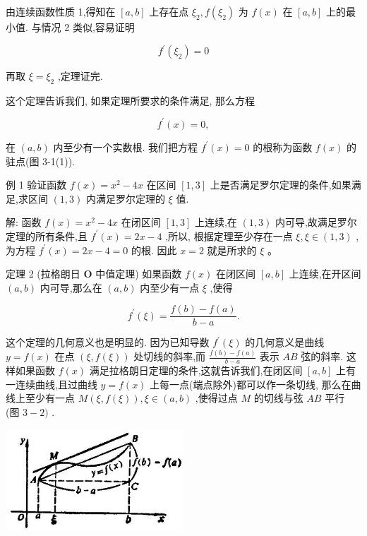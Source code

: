 \documentclass[10pt]{article}
\begin{document}
由连续函数性质 1,得知在 \(\left\lbrack {a,b}\right\rbrack\) 上存在点 \({\xi }_{2},f\left( {\xi }_{2}\right)\) 为 \(f\left( x\right)\) 在 \(\left\lbrack {a,b}\right\rbrack\) 上的最小值. 与情况 2 类似,容易证明

\[
{f}^{\prime }\left( {\xi }_{2}\right) = 0
\]

再取 \(\xi = {\xi }_{2}\) ,定理证完.

这个定理告诉我们, 如果定理所要求的条件满足, 那么方程

\[
{f}^{\prime }\left( x\right) = 0,
\]

在 \(\left( {a,b}\right)\) 内至少有一个实数根. 我们把方程 \({f}^{\prime }\left( x\right) = 0\) 的根称为函数 \(f\left( x\right)\) 的驻点(图 3-1(1)).

例 1 验证函数 \(f\left( x\right) = {x}^{2} - {4x}\) 在区间 \(\left\lbrack {1,3}\right\rbrack\) 上是否满足罗尔定理的条件,如果满足,求区间 \(\left( {1,3}\right)\) 内满足罗尔定理的 \(\xi\) 值.

解: 函数 \(f\left( x\right) = {x}^{2} - {4x}\) 在闭区间 \(\left\lbrack {1,3}\right\rbrack\) 上连续,在 \(\left( {1,3}\right)\) 内可导,故满足罗尔定理的所有条件,且 \({f}^{\prime }\left( x\right) = {2x} - 4\) ,所以, 根据定理至少存在一点 \(\xi ,\xi \in \left( {1,3}\right)\) ,为方程 \({f}^{\prime }\left( x\right) = {2x} - 4 = 0\) 的根. 因此 \(x = 2\) 就是所求的 \(\xi\) 。

定理 2 (拉格朗日 \(\mathbf{O}\) 中值定理) 如果函数 \(f\left( x\right)\) 在闭区间 \(\left\lbrack {a,b}\right\rbrack\) 上连续,在开区间 \(\left( {a,b}\right)\) 内可导,那么在 \(\left( {a,b}\right)\) 内至少有一点 \(\xi\) ,使得

\[
{f}^{\prime }\left( \xi \right) = \frac{f\left( b\right) - f\left( a\right) }{b - a}.
\]

这个定理的几何意义也是明显的. 因为已知导数 \({f}^{\prime }\left( \xi \right)\) 的几何意义是曲线 \(y = f\left( x\right)\) 在点 \(\left( {\xi ,f\left( \xi \right) }\right)\) 处切线的斜率,而 \(\frac{f\left( b\right) - f\left( a\right) }{b - a}\) 表示 \({AB}\) 弦的斜率. 这样如果函数 \(f\left( x\right)\) 满足拉格朗日定理的条件,这就告诉我们,在闭区间 \(\left\lbrack {a,b}\right\rbrack\) 上有一连续曲线,且过曲线 \(y = f\left( x\right)\) 上每一点(端点除外)都可以作一条切线, 那么在曲线上至少有一点 \(M\left( {\xi ,f\left( \xi \right) }\right) ,\xi \in \left( {a,b}\right)\) ,使得过点 \(M\) 的切线与弦 \({AB}\) 平行 (图 \(3 - 2)\) .

\begin{center}
\includegraphics[max width=0.5\textwidth]{images/01912c18-5c3f-733d-b775-749ba9897a9d_133_982068.jpg}
\end{center}
\end{document}

